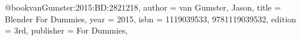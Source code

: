 @book{vanGumster:2015:BD:2821218,
 author = {van Gumster, Jason},
 title = {Blender For Dummies},
 year = {2015},
 isbn = {1119039533, 9781119039532},
 edition = {3rd},
 publisher = {For Dummies},
} 